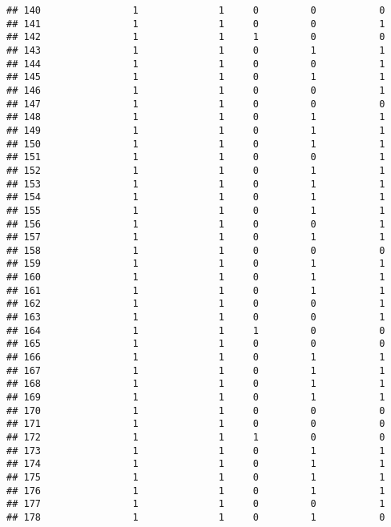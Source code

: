 \documentclass[]{article}
\begin{document}
\begin{verbatim}
## 140                1              1     0         0           0
## 141                1              1     0         0           1
## 142                1              1     1         0           0
## 143                1              1     0         1           1
## 144                1              1     0         0           1
## 145                1              1     0         1           1
## 146                1              1     0         0           1
## 147                1              1     0         0           0
## 148                1              1     0         1           1
## 149                1              1     0         1           1
## 150                1              1     0         1           1
## 151                1              1     0         0           1
## 152                1              1     0         1           1
## 153                1              1     0         1           1
## 154                1              1     0         1           1
## 155                1              1     0         1           1
## 156                1              1     0         0           1
## 157                1              1     0         1           1
## 158                1              1     0         0           0
## 159                1              1     0         1           1
## 160                1              1     0         1           1
## 161                1              1     0         1           1
## 162                1              1     0         0           1
## 163                1              1     0         0           1
## 164                1              1     1         0           0
## 165                1              1     0         0           0
## 166                1              1     0         1           1
## 167                1              1     0         1           1
## 168                1              1     0         1           1
## 169                1              1     0         1           1
## 170                1              1     0         0           0
## 171                1              1     0         0           0
## 172                1              1     1         0           0
## 173                1              1     0         1           1
## 174                1              1     0         1           1
## 175                1              1     0         1           1
## 176                1              1     0         1           1
## 177                1              1     0         0           1
## 178                1              1     0         1           0

\end{verbatim}
\end{document}
